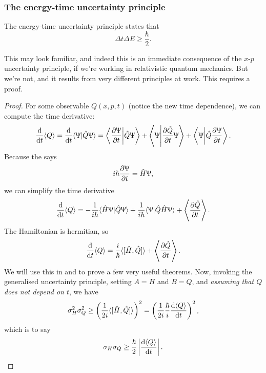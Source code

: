 \subsubsection{The energy-time uncertainty principle}
\begin{thrm}
The energy-time uncertainty principle states 
that
\begin{equation}
\Delta t\Delta E\geq\frac{\hbar}{2}.
\end{equation}
\end{thrm}
This may look familiar, and indeed this is an immediate consequence of the $x$-$p$ 
uncertainty principle, if we're working in relativistic quantum mechanics. 
But we're not, and it results from very different principles at work. 
This requires a proof. 
\begin{proof}
For some observable $Q(x,p,t)$ (notice the new time dependence), we can 
compute the time derivative: 
\begin{equation}
\diff*{\lgl Q\rgl}t=\diff*{\lgl \ups|\hat{Q}\ups\rgl}t=\lf<\diffp{\ups}{t}\middle|\hat{Q}\ups \rt>+\lf<\ups\middle|\diffp{\hat{Q}}{t}\ups \rt>+\lf<\ups\middle|\hat{Q}\diffp{\ups }{t}\rt>. 
\end{equation}
Because the \sch says
\begin{equation}
i\hbar\diffp{\ups}{t}=\hat{H}\ups,
\end{equation}
we can simplify the time derivative
\begin{equation}
\diff*{\lgl Q\rgl}t=-\frac{1}{i\hbar}\lgl \hat{H}\ups|\hat{Q}\ups\rgl+\frac{1}{i\hbar}\lgl \ups|\hat{Q}\hat{H}\ups\rgl+\lf<\diffp{\hat{Q}}{t}\rt>.
\end{equation}
The Hamiltonian is hermitian, so 
\begin{equation}
\label{etuncert_coro}
\diff*{\lgl Q\rgl}t=\frac{i}{\hbar}\lgl [\hat{H},\hat{Q}]\rgl+\lf<\diffp{\hat{Q}}{t}\rt>.
\end{equation}
We will use this in  and  to prove a few very useful theorems. 
Now, invoking the generalised uncertainty principle, setting $A=H$ and $B=Q$, and \textit{assuming that $Q$ does not depend on $t$}, we have 
\begin{equation}
\sigma_H^2\sigma_Q^2\geq\lf(\frac{1}{2i}\lgl [\hat{H},\hat{Q}]\rgl \rt)^2=\lf(\frac{1}{2i}\frac{\hbar}{i}\diff{\lgl Q\rgl}{t} \rt)^2, 
\end{equation}
which is to say
\begin{equation}
\sigma_H\sigma_Q\geq\frac{\hbar}{2}\lf|\diff{\lgl Q\rgl}t\rt|.

\end{equation}
\end{proof}
